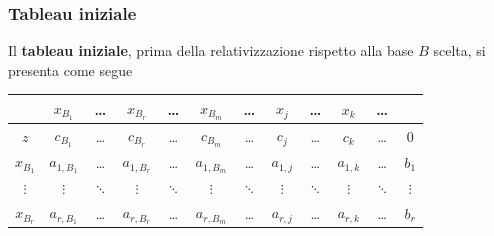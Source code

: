 \documentclass[a4paper]{extarticle}
\renewcommand\arraystretch{}
\begin{document}
\vspace{1em}
\noindent
\subsubsection{Tableau iniziale}
Il \textbf{tableau iniziale}, prima della relativizzazione rispetto alla base $B$ scelta, si presenta come segue

\vspace{1em}
\noindent
\begin{table}[H]
    \setlength{\tabcolsep}{8pt}
    \renewcommand{\arraystretch}{1.5}
    \noindent
    \centering
    \begin{tabular}{|c|ccccc|ccccc|c|}
        & \cellcolor{red!25!white}$x_{B_1}$ & \cellcolor{red!25!white}\dots & \cellcolor{red!25!white}$x_{B_r}$ & \cellcolor{red!25!white}\dots & \cellcolor{red!25!white}$x_{B_m}$ & \cellcolor{blue!25!white} \dots & \cellcolor{blue!25!white} $x_j$ & \cellcolor{blue!25!white} \dots &  \cellcolor{blue!25!white} $x_k$ &  \cellcolor{blue!25!white}\dots & \\
        \hline
        $z$ & \cellcolor{green!25!white}$c_{B_1}$ & \cellcolor{green!25!white}\dots & \cellcolor{green!25!white}$c_{B_r}$ & \cellcolor{green!25!white}\dots & \cellcolor{green!25!white}$c_{B_m}$ & \cellcolor{green!25!white}\dots & \cellcolor{green!25!white}$c_j$ & \cellcolor{green!25!white}\dots & \cellcolor{green!25!white}$c_k$ & \cellcolor{green!25!white}\dots & \cellcolor{green}$0$\\
        \hline
        \cellcolor{red!25!white}$x_{B_1}$ & \cellcolor{red!50!white}$a_{1,B_1}$ & \cellcolor{red!50!white}\dots & \cellcolor{red!50!white}$a_{1,B_r}$ & \cellcolor{red!50!white}\dots & \cellcolor{red!50!white}$a_{1,B_m}$ & \cellcolor{blue!50!white}\dots & \cellcolor{blue!50!white}$a_{1,j}$ & \cellcolor{blue!50!white}\dots & \cellcolor{blue!50!white}$a_{1,k}$ & \cellcolor{blue!50!white}\dots & \cellcolor{orange!25!white}$b_1$\\
        \cellcolor{red!25!white}$\vdots$ & \cellcolor{red!50!white}$\vdots$ & \cellcolor{red!50!white}$\ddots$ & \cellcolor{red!50!white}$\vdots$ & \cellcolor{red!50!white}$\ddots$ & \cellcolor{red!50!white}$\vdots$ & \cellcolor{blue!50!white}$\ddots$ & \cellcolor{blue!50!white}$\vdots$ & \cellcolor{blue!50!white}$\ddots$ & \cellcolor{blue!50!white}$\vdots$ & \cellcolor{blue!50!white}$\ddots$ & \cellcolor{orange!25!white}$\vdots$\\
        \cellcolor{red!25!white}$x_{B_r}$ & \cellcolor{red!50!white}$a_{r,B_1}$ & \cellcolor{red!50!white}\dots & \cellcolor{red!50!white}$a_{r,B_r}$ & \cellcolor{red!50!white} \dots & \cellcolor{red!50!white}$a_{r,B_m}$ &\cellcolor{blue!50!white} \dots & \cellcolor{blue!50!white}$a_{r,j}$ & \cellcolor{blue!50!white}\dots & \cellcolor{blue!50!white}$a_{r,k}$ & \cellcolor{blue!50!white}\dots & \cellcolor{orange!25!white}$b_r$\\

\end{tabular}
\end{table}
\end{document}
